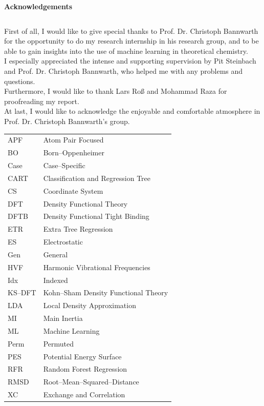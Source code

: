 \documentclass[listof= totoc]{scrreprt}
\numberwithin{equation}{section}
\begin{document}
	\pagebreak
	\textbf{\huge{Acknowledgements}}
\begin{verbatim}
\end{verbatim}
First of all, I would like to give special thanks to Prof. Dr. Christoph Bannwarth for the opportunity to do my research internship in his research group,
and to be able to gain insights into the use of machine learning in theoretical chemistry. \\
I especially appreciated the intense and supporting supervision by Pit Steinbach and Prof. Dr. Christoph Bannwarth, who helped me with any problems and questions.\\
Furthermore, I would like to thank Lars Roß and Mohammad Raza for proofreading my report.\\
At last, I would like to acknowledge the enjoyable and comfortable atmosphere in Prof. Dr. Christoph Bannwarth's group.
\thispagestyle{empty}

	\pagebreak

	\tableofcontents
	\newpage
	\listoffigures
	\listoftables
	\newpage
	
	\begin{table}[H]
		\begin{tabular}{l | l}
			APF & Atom Pair Focused \\
			BO & Born--Oppenheimer \\
			Case & Case--Specific \\
			CART & Classification and Regression Tree \\
			CS & Coordinate System \\
			DFT & Density Functional Theory \\
			DFTB & Density Functional Tight Binding \\
			ETR & Extra Tree Regression \\
			ES & Electrostatic \\
			Gen & General\\
			HVF & Harmonic Vibrational Frequencies \\
			Idx & Indexed \\
			KS--DFT & Kohn--Sham Density Functional Theory \\
			LDA & Local Density Approximation \\
			MI & Main Inertia \\
			ML & Machine Learning \\
			Perm & Permuted \\
			PES & Potential Energy Surface \\
			RFR & Random Forest Regression \\
			RMSD & Root--Mean--Squared--Distance \\
			XC & Exchange and Correlation\\	
		\end{tabular}

	\end{table}
	\newpage
	
\end{document}
